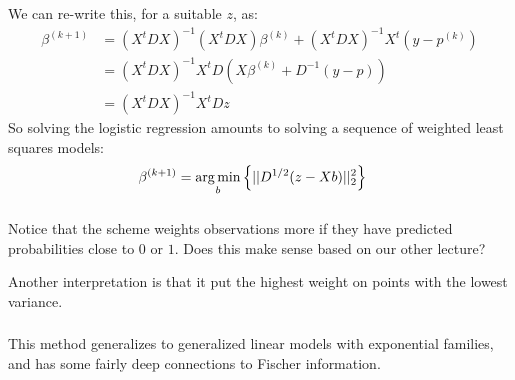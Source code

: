 \begin{frame}[fragile] \frametitle{}

We can re-write this, for a suitable $z$, as:
\begin{align*}
\beta^{(k+1)}
&= (X^t D X)^{-1} (X^t D X) \beta^{(k)} + (X^t D X)^{-1} X^t (y - p^{(k)}) \\
&= (X^t D X)^{-1} X^t D (X \beta^{(k)}  + D^{-1} (y - p) ) \\
&= (X^t D X)^{-1} X^t D z
\end{align*}
\pause So solving the logistic regression amounts to solving a sequence of
weighted least squares models:
\begin{align*}
\beta^{(k+1)} &= \mathop{\mathrm{arg\,min}}_b \left\{ || D^{1/2} (z - Xb) ||_2^2  \right\}
\end{align*}

\end{frame}

\begin{frame}[fragile] \frametitle{}

Notice that the scheme weights observations more if they
have predicted probabilities close to $0$ or $1$. \pause
Does this make sense based on our other lecture?

\pause Another interpretation is that it put the highest
weight on points with the lowest variance.

\end{frame}

\begin{frame}[fragile] \frametitle{}

This method generalizes to generalized linear models with
exponential families, and has some fairly deep connections to
Fischer information.

\end{frame}


